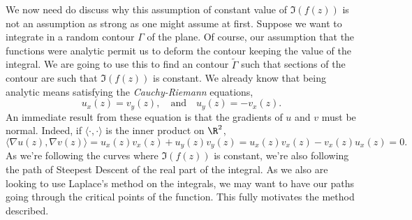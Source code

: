 We now need do discuss why this assumption of constant value of $\Im(f(z))$ is not an assumption as strong as one might assume at first. Suppose we want to integrate in a random contour $\Gamma$ of the plane. Of course, our assumption that the functions were analytic permit us to deform the contour keeping the value of the integral. We are going to use this to find an contour $\tilde{\Gamma}$ such that sections of the contour are such that $\Im(f(z))$ is constant. We already know that being analytic means satisfying the \textit{Cauchy-Riemann} equations,
\begin{equation}
	u_x(z) = v_y(z), \quad \text{and} \quad u_y(z) = -v_x(z).
\end{equation}
An immediate result from these equation is that the gradients of $u$ and $v$ must be normal. Indeed, if $\langle \cdot, \cdot \rangle$ is the inner product on $\R^2$,
$$\langle \nabla u(z), \nabla v(z) \rangle = u_x(z)v_x(z) + u_y(z)v_y(z) = u_x(z)v_x(z) - v_x(z)u_x(z) = 0.$$
As we're following the curves where  $\Im(f(z))$ is constant, we're also following the path of Steepest Descent of the real part of the integral. As we also are looking to use Laplace's method on the integrals, we may want to have our paths going through the critical points of the function. This fully motivates the method described.


